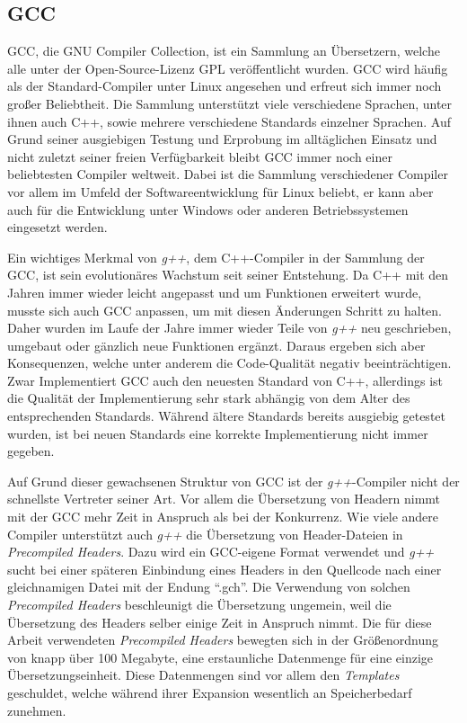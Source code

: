 \subsection{GCC}
GCC, die GNU Compiler Collection, ist ein Sammlung an Übersetzern, welche alle unter der Open-Source-Lizenz GPL veröffentlicht wurden. GCC wird häufig als der Standard-Compiler unter Linux angesehen
und erfreut sich immer noch großer Beliebtheit. Die Sammlung unterstützt viele verschiedene Sprachen, unter ihnen auch C++, sowie mehrere verschiedene Standards einzelner Sprachen. Auf Grund seiner
ausgiebigen Testung und Erprobung im all\-täg\-lich\-en Einsatz und nicht zuletzt seiner freien Verfügbarkeit bleibt GCC immer noch einer beliebtesten Compiler weltweit. Dabei ist die Sammlung verschiedener
Compiler vor allem im Umfeld der Softwareentwicklung für Linux beliebt, er kann aber auch für die Entwicklung unter Windows oder anderen Betriebssystemen eingesetzt werden.

Ein wichtiges Merkmal von \textit{g++}, dem C++-Compiler in der Sammlung der GCC, ist sein evolutionäres Wachstum seit seiner Entstehung. Da C++ mit den Jahren immer wieder lei\-cht angepasst und um Funktionen
erweitert wurde, musste sich auch GCC anpassen, um mit diesen Änderungen Schritt zu halten. Daher wurden im Laufe der Jahre immer wieder Teile von \textit{g++} neu geschrieben, umgebaut oder gänzlich
neue Funktionen ergänzt. Daraus ergeben sich aber Konsequenzen, welche unter anderem die Code-Qualität negativ beeinträchtigen. Zwar Implementiert GCC auch den neuesten Standard von C++, allerdings
ist die Qualität der Implementierung sehr stark abhängig von dem Alter des entsprechenden Standards. Während ältere Standards bereits ausgiebig getestet wurden, ist bei neuen Standards eine korrekte 
Implementierung nicht immer gegeben. 

Auf Grund dieser gewachsenen Struktur von GCC ist der \textit{g++}-Compiler nicht der schnellste Vertreter seiner Art. Vor allem die Übersetzung von Headern nimmt mit der GCC mehr Zeit in Anspruch als
bei der Konkurrenz. Wie viele andere Compiler unterstützt auch \textit{g++} die Übersetzung von Header-Dateien in \textit{Precompiled Headers}. Dazu wird ein GCC-eigene Format verwendet und \textit{g++} sucht bei einer
späteren Einbindung eines Headers in den Quellcode nach einer gleichnamigen Datei mit der Endung ``.gch''. Die Verwendung von solchen \textit{Precompiled Headers} beschleunigt die Übersetzung ungemein, 
weil die Übersetzung des Headers selber einige Zeit in Anspruch nimmt. Die für diese Arbeit verwendeten \textit{Precompiled Headers} bewegten sich in der Größenordnung von knapp über 100 Megabyte, 
eine erstaunliche Datenmenge für eine einzige Übersetzungseinheit. Diese Datenmengen sind vor allem den \textit{Templates} geschuldet, welche während ihrer Expansion wesentlich an Speicherbedarf zunehmen.

